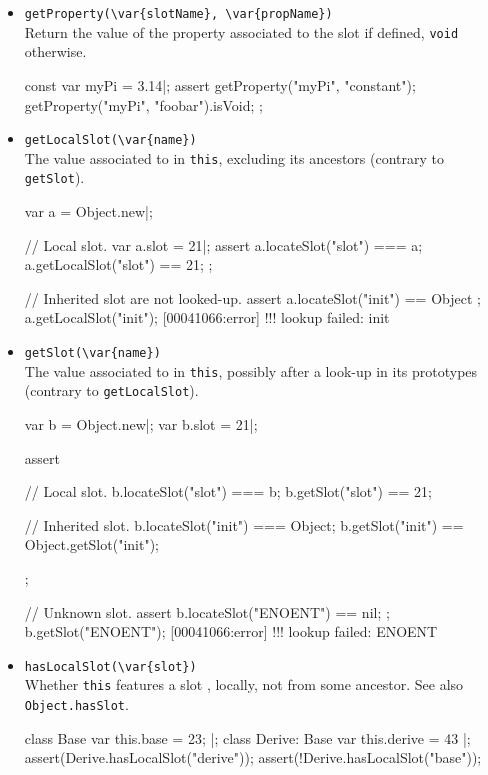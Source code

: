 \begin{itemize}
\item \lstinline|getProperty(\var{slotName}, \var{propName})|\\
  Return the value of the  property associated to the
  slot  if defined, \lstinline|void| otherwise.
\begin{urbiscript}
const var myPi = 3.14|;
assert
{
  getProperty("myPi", "constant");
  getProperty("myPi", "foobar").isVoid;
};
\end{urbiscript}

\item \lstinline|getLocalSlot(\var{name})|\\
  The value associated to  in \lstinline|this|, excluding
  its ancestors (contrary to \lstinline|getSlot|).
\begin{urbiscript}
var a = Object.new|;

// Local slot.
var a.slot = 21|;
assert
{
  a.locateSlot("slot") === a;
  a.getLocalSlot("slot") == 21;
};

// Inherited slot are not looked-up.
assert { a.locateSlot("init") == Object };
a.getLocalSlot("init");
[00041066:error] !!! lookup failed: init
\end{urbiscript}

\item \lstinline|getSlot(\var{name})|\\
  The value associated to  in \lstinline|this|, possibly
  after a look-up in its prototypes (contrary to
  \lstinline|getLocalSlot|).
\begin{urbiscript}
var b = Object.new|;
var b.slot = 21|;

assert
{
  // Local slot.
  b.locateSlot("slot") === b;
  b.getSlot("slot") == 21;

  // Inherited slot.
  b.locateSlot("init") === Object;
  b.getSlot("init") == Object.getSlot("init");
};

// Unknown slot.
assert { b.locateSlot("ENOENT") == nil; };
b.getSlot("ENOENT");
[00041066:error] !!! lookup failed: ENOENT
\end{urbiscript}

\item \lstinline|hasLocalSlot(\var{slot})|\\
  Whether \lstinline|this| features a slot , locally, not
  from some ancestor.  See also \lstinline|Object.hasSlot|.
\begin{urbiscript}
class Base         { var this.base = 23; } |;
class Derive: Base { var this.derive = 43 } |;
assert(Derive.hasLocalSlot("derive"));
assert(!Derive.hasLocalSlot("base"));
\end{urbiscript}


\end{itemize}

